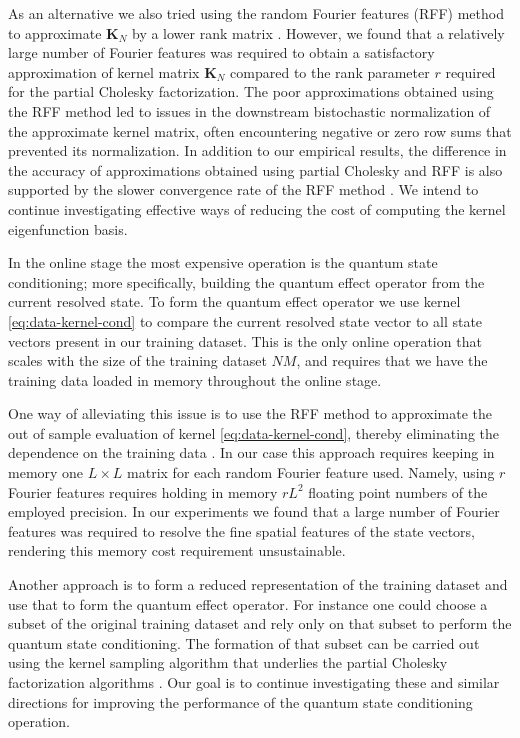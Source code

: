 \documentclass[letterpaper,10pt,3p,preprint]{elsarticle}
\newcommand{\matr}[1]{\bm{#1}}
\begin{document}
As an alternative we also tried using the random Fourier
features (RFF) method to approximate $\matr{K}_N$
by a lower rank matrix \cite{Rahimi2007}.
However, we found that a relatively large number of Fourier
features was required to obtain a satisfactory approximation
of kernel matrix $\matr{K}_N$ compared to the rank
parameter $r$ required for the partial Cholesky factorization.
The poor approximations obtained using the RFF method led to
issues in the downstream bistochastic normalization of
the approximate kernel matrix,
often encountering negative or zero row sums that
prevented its normalization.
In addition to our empirical results, the difference in the
accuracy of approximations obtained using partial Cholesky
and RFF is also supported by the slower convergence rate
of the RFF method \cite{YChen2024}.
We intend to continue investigating effective ways of reducing
the cost of computing the kernel eigenfunction basis.

In the online stage the most expensive operation is the quantum
state conditioning; more specifically, building the quantum effect
operator from the current resolved state.
To form the quantum effect operator we use kernel
\eqref{eq:data-kernel-cond}
to compare the current resolved state vector to all state
vectors present in our training dataset.
This is the only online operation that scales with the size
of the training dataset $NM$, and requires that we have the
training data loaded in memory throughout the online stage.

One way of alleviating this issue is to use the RFF method
to approximate the out of sample evaluation of kernel
\eqref{eq:data-kernel-cond},
thereby eliminating the dependence on the training data
\cite{Rahimi2007,Giannakis2023}.
In our case this approach requires keeping in memory one
$L\times L$ matrix for each random Fourier feature used.
Namely, using $r$ Fourier features requires holding in memory
$rL^2$ floating point numbers of the employed precision.
In our experiments we found that a large number of Fourier
features was required to resolve the fine spatial features of
the state vectors, rendering this memory cost requirement
unsustainable.

Another approach is to form a reduced representation of the
training dataset and use that to form the quantum effect
operator.
For instance one could choose a subset of the original
training dataset and rely only on that subset to
perform the quantum state conditioning.
The formation of that subset can be carried out using the kernel
sampling algorithm that underlies the partial Cholesky factorization
algorithms \cite{YChen2024}.
Our goal is to continue investigating these and similar directions
for improving the performance of the quantum state conditioning
operation.
\end{document}
